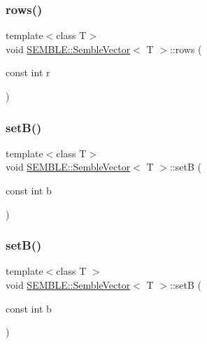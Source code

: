 \mbox{\label{structSEMBLE_1_1SembleVector_ab123cb720f7df7ec85a288ea2e8c8338}} 
\subsubsection{\texorpdfstring{rows()}{rows()}\hspace{0.1cm}{\footnotesize\ttfamily [4/4]}}
{\footnotesize\ttfamily template$<$class T$>$ \\
void \mbox{\hyperlink{structSEMBLE_1_1SembleVector}{S\+E\+M\+B\+L\+E\+::\+Semble\+Vector}}$<$ T $>$\+::rows (\begin{DoxyParamCaption}\item[{const int}]{r }\end{DoxyParamCaption})\hspace{0.3cm}{\ttfamily [inline]}}

\mbox{\label{structSEMBLE_1_1SembleVector_a9f30d2d19ce553c89a695905f770a3d4}} 
\subsubsection{\texorpdfstring{setB()}{setB()}\hspace{0.1cm}{\footnotesize\ttfamily [1/2]}}
{\footnotesize\ttfamily template$<$class T$>$ \\
void \mbox{\hyperlink{structSEMBLE_1_1SembleVector}{S\+E\+M\+B\+L\+E\+::\+Semble\+Vector}}$<$ T $>$\+::setB (\begin{DoxyParamCaption}\item[{const int}]{b }\end{DoxyParamCaption})}

\mbox{\label{structSEMBLE_1_1SembleVector_a9f30d2d19ce553c89a695905f770a3d4}} 
\subsubsection{\texorpdfstring{setB()}{setB()}\hspace{0.1cm}{\footnotesize\ttfamily [2/2]}}
{\footnotesize\ttfamily template$<$class T $>$ \\
void \mbox{\hyperlink{structSEMBLE_1_1SembleVector}{S\+E\+M\+B\+L\+E\+::\+Semble\+Vector}}$<$ T $>$\+::setB (\begin{DoxyParamCaption}\item[{const int}]{b }\end{DoxyParamCaption})}

